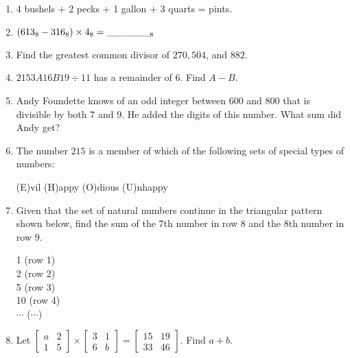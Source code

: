 \documentclass[../uilmath.tex]{subfiles}
\begin{document}
\begin{enumerate}[label=\bfseries\arabic*.]
    \item %
    4 bushels + 2 pecks + 1 gallon + 3 quarts = \blank pints.

    \item %
    $(613_8-316_8)\times 4_8 = \_\_\_\_\_\__8$

    \item %
    Find the greatest common divisor of $270,504$, and $882$.

    \item %
    $2153A16B19\div 11$ has a remainder of $6$. Find $A-B$.

    \item %
    Andy Foundette knows of an odd integer between $600$ and $800$ that is divisible by both $7$ and $9$. He added the digits of this number. What sum did Andy get?

    \item %
    The number $215$ is a member of which of the following sets of special types of numbers:
    \begin{center}
        (E)vil \quad (H)appy \quad (O)dious \quad (U)nhappy
    \end{center}

    \item %
    Given that the set of natural numbers continue in the triangular pattern shown below, find the sum of the 7th number in row 8 and the 8th number in row 9.
    \begin{center}
        1 \qquad (row 1)\\
        2   \qquad (row 2)\\
        5     \qquad (row 3)\\
        10       \qquad (row 4)\\
        $\cdots$ \qquad ($\cdots$)
    \end{center}

    \item %
    Let $\begin{bmatrix}
        a & 2\\
        1 & 5
    \end{bmatrix}\times \begin{bmatrix}
        3 & 1\\
        6 & b
    \end{bmatrix}=\begin{bmatrix}
        15 & 19\\
        33 & 46
    \end{bmatrix}$. Find $a+b$.


\end{enumerate}
\end{document}
